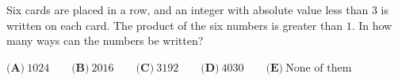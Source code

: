 Six cards are placed in a row, and an integer with absolute value less than $3$ is written on each card. The product of the six numbers is greater than $1$. In how many ways can the numbers be written?

$\textbf{(A)}\ 1024\qquad\textbf{(B)}\ 2016\qquad\textbf{(C)}\ 3192\qquad\textbf{(D)}\ 4030\qquad\textbf{(E)}\ \text{None of them}$

